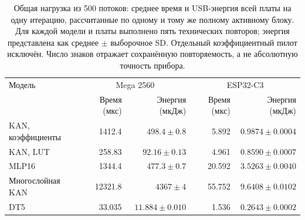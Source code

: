 \begin{table}[!htbp]
\centering\small\setlength{\tabcolsep}{7pt}
\caption{Общая нагрузка из 500 потоков: среднее время и USB-энергия всей платы на одну итерацию, рассчитанные по одному и тому же полному активному блоку. Для каждой модели и платы выполнено пять технических повторов; энергия представлена как среднее $\pm$ выборочное SD. Отдельный коэффициентный пилот исключён. Число знаков отражает сохранённую повторяемость, а не абсолютную точность прибора.}
\label{tab:hw500-energy}
\begin{tabular}{lrrrr}
\toprule
Модель & \multicolumn{2}{c}{Mega 2560} & \multicolumn{2}{c}{ESP32-C3} \\
 & Время (мкс) & Энергия (мкДж) & Время (мкс) & Энергия (мкДж) \\
\midrule
KAN, коэффициенты & 1412.4 & $498.4\pm0.8$ & 5.892 & $0.9874\pm0.0004$ \\
KAN, LUT & 258.83 & $92.16\pm0.13$ & 4.961 & $0.8590\pm0.0007$ \\
MLP16 & 1344.4 & $477.3\pm0.7$ & 20.592 & $3.5263\pm0.0040$ \\
Многослойная KAN & 12321.8 & $4367\pm4$ & 55.752 & $9.6408\pm0.0102$ \\
DT5 & 33.035 & $11.884\pm0.010$ & 1.536 & $0.2643\pm0.0002$ \\
\bottomrule
\end{tabular}
\end{table}
